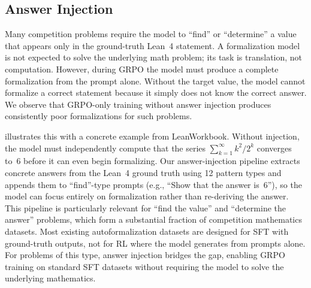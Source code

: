 \documentclass[11pt,a4paper]{article}
\begin{document}
\subsection{Answer Injection}\label{sec:answer_injection}

Many competition problems require the model to ``find'' or ``determine'' a value that appears only in the ground-truth Lean~4 statement. A formalization model is not expected to solve the underlying math problem; its task is translation, not computation. However, during GRPO the model must produce a complete formalization from the prompt alone. Without the target value, the model cannot formalize a correct statement because it simply does not know the correct answer. We observe that GRPO-only training without answer injection produces consistently poor formalizations for such problems.

 illustrates this with a concrete example from LeanWorkbook. Without injection, the model must independently compute that the series $\sum_{k=1}^{\infty} k^2/2^k$ converges to~6 before it can even begin formalizing. Our answer-injection pipeline extracts concrete answers from the Lean~4 ground truth using 12 pattern types and appends them to ``find''-type prompts (e.g., ``Show that the answer is~6''), so the model can focus entirely on formalization rather than re-deriving the answer. This pipeline is particularly relevant for ``find the value'' and ``determine the answer'' problems, which form a substantial fraction of competition mathematics datasets. Most existing autoformalization datasets are designed for SFT with ground-truth outputs, not for RL where the model generates from prompts alone. For problems of this type, answer injection bridges the gap, enabling GRPO training on standard SFT datasets without requiring the model to solve the underlying mathematics.
\end{document}
